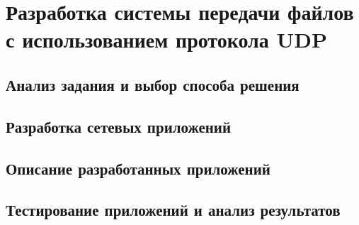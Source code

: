 
\section{Разработка системы передачи файлов с использованием протокола UDP}

\subsection{Анализ задания и выбор способа решения}


\subsection{Разработка сетевых приложений}


\subsection{Описание разработанных приложений}


\subsection{Тестирование приложений и анализ результатов}

